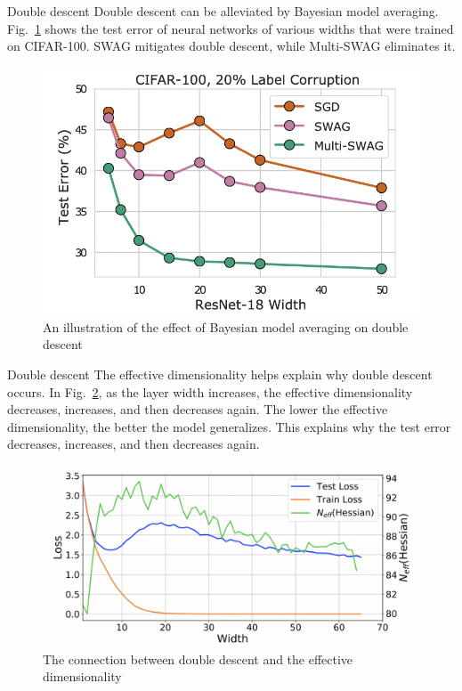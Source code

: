 \documentclass{beamer}
\begin{document}
\begin{frame}{Double descent}
    Double descent can be alleviated by Bayesian model averaging. Fig.~\ref{fig:double_descent_and_bma} shows the test error of neural networks of various widths that were trained on CIFAR-100. SWAG mitigates double descent, while Multi-SWAG eliminates it.
    \begin{figure}
        \centering
        \includegraphics[scale=0.5]{double_descent_and_bma}
        \caption{An illustration of the effect of Bayesian model averaging on double descent}
        \label{fig:double_descent_and_bma}
    \end{figure}
\end{frame}

\begin{frame}{Double descent}
    The effective dimensionality helps explain why double descent occurs. In Fig.~\ref{fig:double_descent_and_effective_dimensionality}, as the layer width increases, the effective dimensionality decreases, increases, and then decreases again. The lower the effective dimensionality, the better the model generalizes. This explains why the test error decreases, increases, and then decreases again.
    \begin{figure}
        \centering
        \includegraphics[scale=0.4]{double_descent_and_effective_dimensionality}
        \caption{The connection between double descent and the effective dimensionality}
        \label{fig:double_descent_and_effective_dimensionality}
    \end{figure}
\end{frame}
\end{document}
